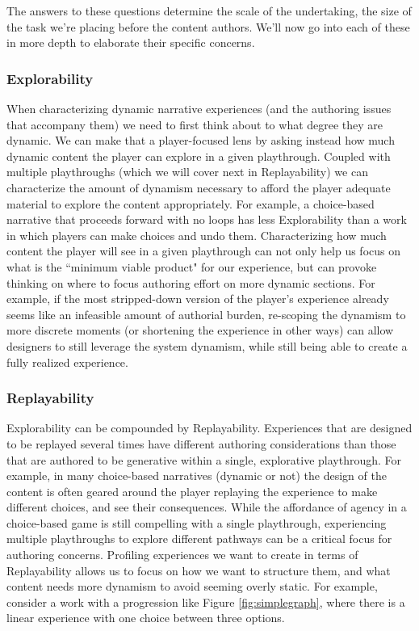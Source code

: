 The answers to these questions determine the scale of the undertaking, the size of the task we're placing before the content authors. We'll now go into each of these in more depth to elaborate their specific concerns.

\subsubsection{Explorability}

When characterizing dynamic narrative experiences (and the authoring issues that accompany them) we need to first think about to what degree they are dynamic. We can make that a player-focused lens by asking instead how much dynamic content the player can explore in a given playthrough. Coupled with multiple playthroughs (which we will cover next in Replayability) we can characterize the amount of dynamism necessary to afford the player adequate material to explore the content appropriately. For example, a choice-based narrative that proceeds forward with no loops has less Explorability than a work in which players can make choices and undo them. Characterizing how much content the player will see in a given playthrough can not only help us focus on what is the ``minimum viable product" for our experience, but can provoke thinking on where to focus authoring effort on more dynamic sections. For example, if the most stripped-down version of the player's experience already seems like an infeasible amount of authorial burden, re-scoping the dynamism to more discrete moments (or shortening the experience in other ways) can allow designers to still leverage the system dynamism, while still being able to create a fully realized experience.

\subsubsection{Replayability}

Explorability can be compounded by Replayability. Experiences that are designed to be replayed several times have different authoring considerations than those that are authored to be generative within a single, explorative playthrough. For example, in many choice-based narratives (dynamic or not) the design of the content is often geared around the player replaying the experience to make different choices, and see their consequences. While the affordance of agency in a choice-based game is still compelling with a single playthrough, experiencing multiple playthroughs to explore different pathways can be a critical focus for authoring concerns. Profiling experiences we want to create in terms of Replayability allows us to focus on how we want to structure them, and what content needs more dynamism to avoid seeming overly static. For example, consider a work with a progression like Figure \ref{fig:simplegraph}, where there is a linear experience with one choice between three options.

